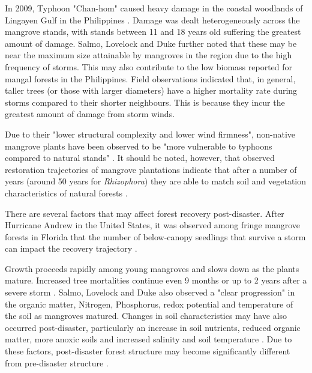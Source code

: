 In 2009, Typhoon "Chan-hom" caused heavy damage in the coastal woodlands of Lingayen Gulf in the Philippines \cite{Salmo2013}. Damage was dealt  heterogeneously across the mangrove stands, with stands between 11 and 18 years old suffering the greatest amount of damage. Salmo, Lovelock and Duke further noted that these may be near the maximum size attainable by mangroves in the region due to the high frequency of storms. This may also contribute to the low biomass reported for mangal forests in the Philippines. Field observations indicated that, in general, taller trees (or those with larger diameters) have a higher mortality rate during storms compared to their shorter neighbours. This is because they incur the greatest amount of damage from storm winds. 

Due to their "lower structural complexity and lower wind firmness", non-native mangrove plants have been observed to be "more vulnerable to typhoons compared to natural stands" \cite{Salmo2013}. It should be noted, however, that observed restoration trajectories of mangrove plantations indicate that after a number of years (around 50 years for \emph{Rhizophora}) they are able to match soil and vegetation characteristics of natural forests \cite{Salmo2011}.

There are several factors that may affect forest recovery post-disaster. After Hurricane Andrew in the United States, it was observed among fringe mangrove forests in Florida that the number of below-canopy seedlings that survive a storm can impact the recovery trajectory \cite{Baldwin2001}. 

Growth proceeds rapidly among young mangroves and slows down as the plants mature. Increased tree mortalities continue even 9 months or up to 2 years after a severe storm \cite{Salmo2013}. Salmo, Lovelock and Duke \cite{Salmo2011} also observed a "clear progression" in the organic matter, Nitrogen, Phosphorus, redox potential and temperature of the soil as mangroves matured. Changes in soil characteristics may have also occurred post-disaster, particularly an increase in soil nutrients, reduced organic matter, more anoxic soils and increased salinity and soil temperature \cite{Salmo2013}. Due to these factors, post-disaster forest structure may become significantly different from pre-disaster structure \cite{Baldwin2001}.